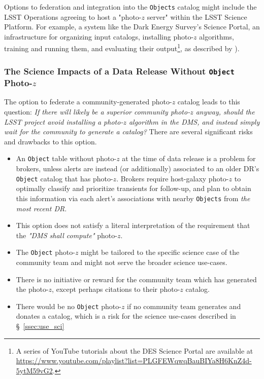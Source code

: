 \documentclass[DM,lsstdraft,toc]{lsstdoc}
\begin{document}
Options to federation and integration into the {\tt Objects} catalog might include the LSST Operations agreeing to host a "photo-$z$ server" within the LSST Science Platform.
For example, a system like the Dark Energy Survey's Science Portal, an infrastructure for organizing input catalogs, installing photo-$z$ algorithms, training and running them, and evaluating their output\footnote{A series of YouTube tutorials about the DES Science Portal are available at \url{https://www.youtube.com/playlist?list=PLGFEWqwqBauBIYa8H6KnZ4d-5ytM59vG2}.}, as described by \citet{2018A&C....25...58G}).

\subsubsection{The Science Impacts of a Data Release Without {\tt Object} Photo-$z$}

The option to federate a community-generated photo-$z$ catalog leads to this question: {\it If there will likely be a superior community photo-$z$ anyway, should the LSST project avoid installing a photo-$z$ algorithm in the DMS, and instead simply wait for the community to generate a catalog?}
There are several significant risks and drawbacks to this option.
\vspace{-15pt}
\begin{itemize}
\item An {\tt Object} table without photo-$z$ at the time of data release is a problem for brokers, unless alerts are instead (or additionally) associated to an older DR's {\tt Object} catalog that has photo-$z$. Brokers require host-galaxy photo-$z$ to optimally classify and prioritize transients for follow-up, and plan to obtain this information via each alert's associations with nearby {\tt Objects} from {\it the most recent DR}.
\item This option does not satisfy a literal interpretation of the requirement that the {\it "DMS shall compute"} photo-$z$.
\item The {\tt Object} photo-$z$ might be tailored to the specific science case of the community team and might not serve the broader science use-cases.
\item There is no initiative or reward for the community team which has generated the photo-$z$, except perhaps citations to their photo-$z$ catalog.
\item There would be no {\tt Object} photo-$z$ if no community team generates and donates a catalog, which is a risk for the science use-cases described in \S~\ref{ssec:use_sci}
\end{itemize}
\end{document}
